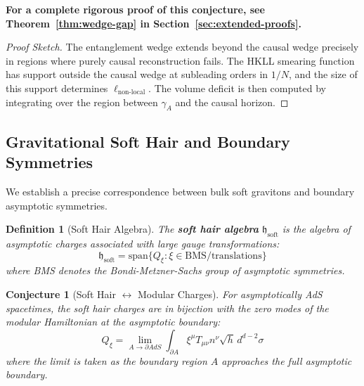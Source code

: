 \documentclass[12pt,a4paper]{article}
\newtheorem{conjecture}[theorem]{Conjecture}
\newtheorem{definition}[theorem]{Definition}
\begin{document}
\textbf{For a complete rigorous proof of this conjecture, see Theorem~\ref{thm:wedge-gap} in Section~\ref{sec:extended-proofs}.}

\begin{proof}[Proof Sketch]
The entanglement wedge extends beyond the causal wedge precisely in regions where purely causal reconstruction fails. The HKLL smearing function has support outside the causal wedge at subleading orders in $1/N$, and the size of this support determines $\ell_{\text{non-local}}$. The volume deficit is then computed by integrating over the region between $\gamma_A$ and the causal horizon.
\end{proof}

\subsection{Gravitational Soft Hair and Boundary Symmetries}

We establish a precise correspondence between bulk soft gravitons and boundary asymptotic symmetries.

\begin{definition}[Soft Hair Algebra]
The \textbf{soft hair algebra} $\mathfrak{h}_{\text{soft}}$ is the algebra of asymptotic charges associated with large gauge transformations:
\begin{equation}
\mathfrak{h}_{\text{soft}} = \text{span}\{ Q_\xi : \xi \in \text{BMS}/\text{translations} \}
\end{equation}
where BMS denotes the Bondi-Metzner-Sachs group of asymptotic symmetries.
\end{definition}

\begin{conjecture}[Soft Hair $\leftrightarrow$ Modular Charges]
For asymptotically AdS spacetimes, the soft hair charges are in bijection with the zero modes of the modular Hamiltonian at the asymptotic boundary:
\begin{equation}
Q_\xi = \lim_{A \to \partial AdS} \int_{\partial A} \xi^\mu T_{\mu\nu} n^\nu \sqrt{h} \, d^{d-2}\sigma
\end{equation}
where the limit is taken as the boundary region $A$ approaches the full asymptotic boundary.
\end{conjecture}
\end{document}
